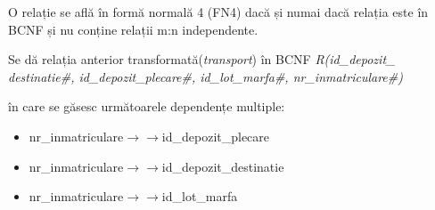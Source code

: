 \documentclass[12pt, a4paper]{article}
\begin{document}
\begin{table}[!htbp]
\begin{center}
    \caption{Relația \emph{R2(X\#, K4)}}\label{tab13-2}
\end{center}
\end{table}

O relație se află în formă normală 4 (FN4) dacă și numai dacă relația este în BCNF și nu conține relații m:n independente.

Se dă relația anterior transformată(\emph{transport}) în BCNF \emph{R(id\_depozit\_\\destinatie\#, id\_depozit\_plecare\#, id\_lot\_marfa\#, nr\_inmatriculare\#)}

\begin{table}[!htbp]
\begin{center}
    \caption{Relația \emph{transport}}\label{tab14}
\end{center}
\end{table}

în care se găsesc următoarele dependențe multiple:

\begin{itemize}
    \item nr\_inmatriculare$\rightarrow\rightarrow$id\_depozit\_plecare
    \item nr\_inmatriculare$\rightarrow\rightarrow$id\_depozit\_destinatie
    \item nr\_inmatriculare$\rightarrow\rightarrow$id\_lot\_marfa
\end{itemize}
\end{document}
